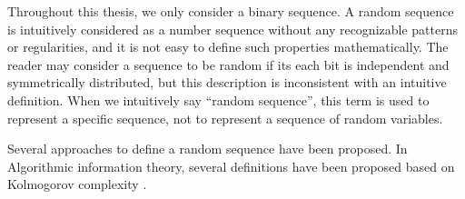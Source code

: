 Throughout this thesis, we only consider a binary sequence.
%
A random sequence is intuitively considered as a number sequence without any recognizable patterns or regularities, and it is not easy to define such properties mathematically.
The reader may consider a sequence to be random if its each bit is independent and symmetrically distributed, but this description is inconsistent with an intuitive definition. When we intuitively say ``random sequence'', this term is used to represent a specific sequence, not to represent a sequence of random variables.
%
\par
Several approaches to define a random sequence have been proposed.
%
%
In Algorithmic information theory, several definitions have been proposed based on Kolmogorov 
complexity \cite{kolmogorov1968three,chaitin1966length,chaitin1969length,chaitin1975theory}. 
